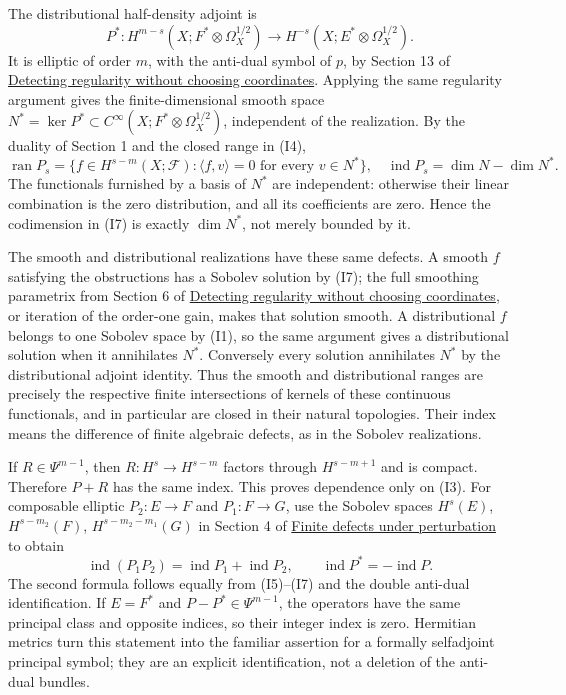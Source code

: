 \documentclass[
  11pt,
]{article}
\begin{document}
The distributional half-density adjoint is \[
P^*:H^{m-s}(X;F^*\otimes\Omega_X^{1/2})
 \longrightarrow H^{-s}(X;E^*\otimes\Omega_X^{1/2}).
\tag{I6}
\] It is elliptic of order \(m\), with the anti-dual symbol of \(p\), by
Section 13 of \href{geometric-microlocal-calculus.pdf}{Detecting
regularity without choosing coordinates}. Applying the same regularity
argument gives the finite-dimensional smooth space
\(N^*=\ker P^*\subset C^\infty(X;F^*\otimes\Omega_X^{1/2})\),
independent of the realization. By the duality of Section 1 and the
closed range in (I4), \[
\operatorname{ran}P_s
 =\{f\in H^{s-m}(X;\mathcal F):\langle f,v\rangle=0\text{ for every }v\in N^*\},
\quad
\operatorname{ind}P_s=\dim N-\dim N^*.
\tag{I7}
\] The functionals furnished by a basis of \(N^*\) are independent:
otherwise their linear combination is the zero distribution, and all its
coefficients are zero. Hence the codimension in (I7) is exactly
\(\dim N^*\), not merely bounded by it.

The smooth and distributional realizations have these same defects. A
smooth \(f\) satisfying the obstructions has a Sobolev solution by (I7);
the full smoothing parametrix from Section 6 of
\href{geometric-microlocal-calculus.pdf}{Detecting regularity without
choosing coordinates}, or iteration of the order-one gain, makes that
solution smooth. A distributional \(f\) belongs to one Sobolev space by
(I1), so the same argument gives a distributional solution when it
annihilates \(N^*\). Conversely every solution annihilates \(N^*\) by
the distributional adjoint identity. Thus the smooth and distributional
ranges are precisely the respective finite intersections of kernels of
these continuous functionals, and in particular are closed in their
natural topologies. Their index means the difference of finite algebraic
defects, as in the Sobolev realizations.

If \(R\in\Psi^{m-1}\), then \(R:H^s\to H^{s-m}\) factors through
\(H^{s-m+1}\) and is compact. Therefore \(P+R\) has the same index. This
proves dependence only on (I3). For composable elliptic \(P_2:E\to F\)
and \(P_1:F\to G\), use the Sobolev spaces \(H^s(E)\), \(H^{s-m_2}(F)\),
\(H^{s-m_2-m_1}(G)\) in Section 4 of \href{fredholm-stability.pdf}{Finite
defects under perturbation} to obtain \[
\operatorname{ind}(P_1P_2)=\operatorname{ind}P_1+\operatorname{ind}P_2,
\qquad \operatorname{ind}P^*=-\operatorname{ind}P.
\tag{I8}
\] The second formula follows equally from (I5)--(I7) and the double
anti-dual identification. If \(E=F^*\) and \(P-P^*\in\Psi^{m-1}\), the
operators have the same principal class and opposite indices, so their
integer index is zero. Hermitian metrics turn this statement into the
familiar assertion for a formally selfadjoint principal symbol; they are
an explicit identification, not a deletion of the anti-dual bundles.
\end{document}
